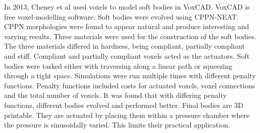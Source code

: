 In 2013, Cheney et al used voxels to model soft bodies in VoxCAD. VoxCAD is free voxel-modelling software. Soft bodies were evolved using CPPN-NEAT. CPPN morphologies were found to appear natural and produce interesting and varying results. Three materials were used for the construction of the soft bodies. The three materials differed in hardness, being compliant, partially compliant and stiff. Compliant and partially compliant voxels acted as the actuators. Soft bodies were tasked either with traversing along a linear path or squeezing through a tight space. Simulations were run multiple times with different penalty functions. Penalty functions included costs for actuated voxels, voxel connections and the total number of voxels. It was found that with differing penalty functions, different bodies evolved and performed better. Final bodies are 3D printable. They are actuated by placing them within a pressure chamber where the pressure is sinusoidally varied. This limits their practical application. \cite{Cheney2013,Cheney2015}